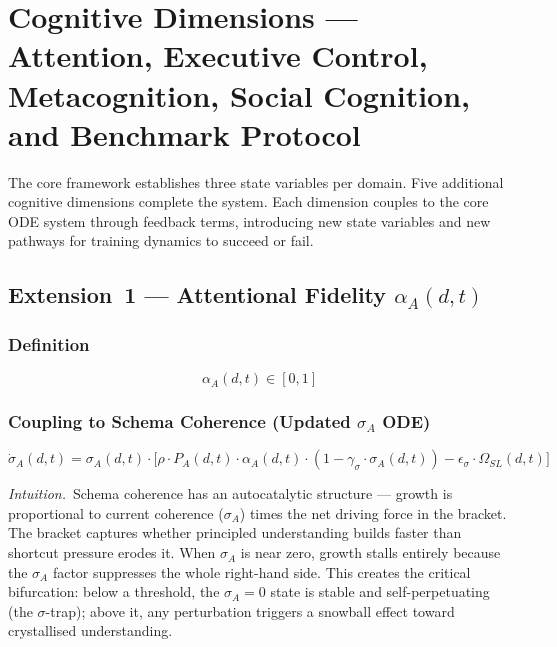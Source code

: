 
\section{Cognitive Dimensions --- Attention, Executive Control,
Metacognition, Social Cognition, and Benchmark Protocol}\label{sec:cognitive-dimensions}

The core framework establishes three state variables per domain. Five
additional cognitive dimensions complete the system. Each dimension couples to the core ODE system through feedback terms, introducing new state variables and new pathways for training dynamics to succeed or fail.

\subsection{Extension~1 --- Attentional Fidelity \texorpdfstring{$\alpha_A(d,t)$}{alpha\_A(d,t)}}\label{sec:attention}

\subsubsection{Definition}
\begin{equation}\label{eq:alpha-bounds}
\alpha_A(d,t) \in [0,1]
\end{equation}

\subsubsection{Coupling to Schema Coherence (Updated \texorpdfstring{$\sigma_A$}{sigma\_A} ODE)}
\begin{equation}\label{eq:sigma-ode}
\dot{\sigma}_A(d,t) = \sigma_A(d,t) \cdot \bigl[ \rho \cdot P_A(d,t) \cdot \alpha_A(d,t) \cdot (1 - \gamma_{\sigma} \cdot \sigma_A(d,t)) - \epsilon_{\sigma} \cdot \Omega_{SL}(d,t) \bigr]
\end{equation}

\noindent\textit{Intuition.}\ Schema coherence has an autocatalytic
structure --- growth is proportional to current coherence ($\sigma_A$)
times the net driving force in the bracket. The bracket captures whether
principled understanding builds faster than shortcut pressure erodes it.
When $\sigma_A$ is near zero, growth stalls entirely because the
$\sigma_A$ factor suppresses the whole right-hand side. This creates the
critical bifurcation: below a threshold, the $\sigma_A = 0$ state is
stable and self-perpetuating (the $\sigma$-trap); above it, any
perturbation triggers a snowball effect toward crystallised
understanding.


